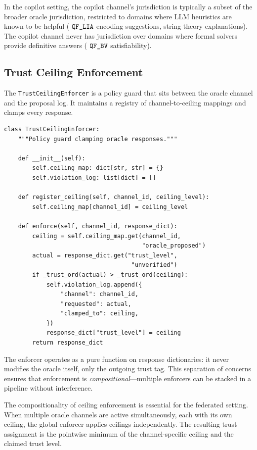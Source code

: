 \documentclass[11pt]{article}
\newcommand{\TCeil}{\texttt{TrustCeilingEnforcer}}
\begin{document}
In the copilot setting, the copilot channel's jurisdiction is
typically a subset of the broader oracle jurisdiction, restricted
to domains where LLM heuristics are known to be helpful (\eg{}
$\texttt{QF\_LIA}$ encoding suggestions, string theory explanations).  The
copilot channel never has jurisdiction over domains where formal
solvers provide definitive answers (\eg{} $\texttt{QF\_BV}$ satisfiability).

\subsection{Trust Ceiling Enforcement}\label{sec:enforcement}

The \TCeil{} is a policy guard that sits between the oracle
channel and the proposal log.  It maintains a registry of
channel-to-ceiling mappings and clamps every response.

\begin{lstlisting}[style=jugeo-python,caption={TrustCeilingEnforcer.}]
class TrustCeilingEnforcer:
    """Policy guard clamping oracle responses."""

    def __init__(self):
        self.ceiling_map: dict[str, str] = {}
        self.violation_log: list[dict] = []

    def register_ceiling(self, channel_id, ceiling_level):
        self.ceiling_map[channel_id] = ceiling_level

    def enforce(self, channel_id, response_dict):
        ceiling = self.ceiling_map.get(channel_id,
                                       "oracle_proposed")
        actual = response_dict.get("trust_level",
                                    "unverified")
        if _trust_ord(actual) > _trust_ord(ceiling):
            self.violation_log.append({
                "channel": channel_id,
                "requested": actual,
                "clamped_to": ceiling,
            })
            response_dict["trust_level"] = ceiling
        return response_dict
\end{lstlisting}

The enforcer operates as a pure function on response dictionaries:
it never modifies the oracle itself, only the outgoing trust tag.
This separation of concerns ensures that enforcement is
\emph{compositional}---multiple enforcers can be stacked in a
pipeline without interference.

The compositionality of ceiling enforcement is essential for the
federated setting.  When multiple oracle channels are active
simultaneously, each with its own ceiling, the global enforcer
applies ceilings independently.  The resulting trust assignment is
the pointwise minimum of the channel-specific ceiling and the
claimed trust level.
\end{document}
